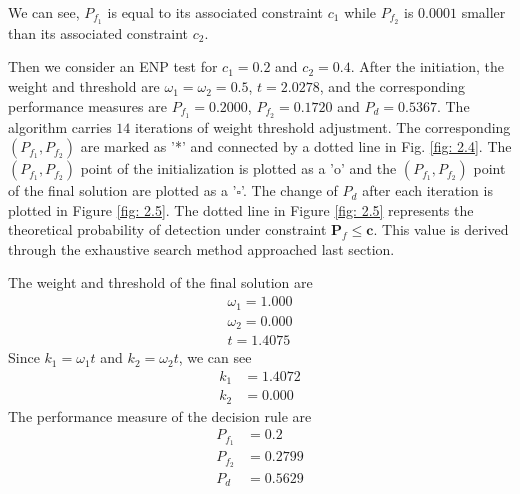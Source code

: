 We can see, $P_{f_1}$ is equal to its associated constraint $c_1$  while $P_{f_2}$ is $0.0001$ smaller than its associated  constraint $c_2$. 


Then we consider an ENP test for $c_1 = 0.2$ and $c_2 = 0.4$.
After the initiation, the weight and threshold are $\omega_1 = \omega_2 = 0.5$, $t =2.0278$, and the corresponding performance measures are $P_{f_1}  = 0.2000$, $P_{f_2} = 0.1720$ and $P_d = 0.5367$. The algorithm carries $14$ iterations of weight  threshold adjustment. The corresponding $(P_{f_1}, P_{f_2})$ are   
marked as '*' and connected by a dotted line in Fig. \ref{fig: 2.4}. 
The $(P_{f_1}, P_{f_2})$ point of the initialization is plotted as  a 'o' and the $(P_{f_1}, P_{f_2})$ point of the final solution are plotted as a '$\square$'. The change of $P_d$ after each iteration is plotted in Figure \ref{fig: 2.5}. 
The dotted line in Figure \ref{fig: 2.5} represents the theoretical probability of detection under constraint $\mathbf{P}_f \leq \mathbf{c}$. This value is derived through the exhaustive search method approached last section.  


The weight and threshold of the final solution are
\[
\begin{split}
\omega_1 = 1.000\\
\omega_2 = 0.000\\
t = 1.4075
\end{split}
\]
Since $k_1 = \omega_1t$ and $k_2 = \omega_2t$, we can see
\[
\begin{split}
k_1 &= 1.4072\\
k_2 &= 0.000
\end{split}
\]
The performance measure of the decision rule are
\[
\begin{split}
P_{f_1} &= 0.2\\
P_{f_2} &= 0.2799\\
P_d &= 0.5629
\end{split}
\]

